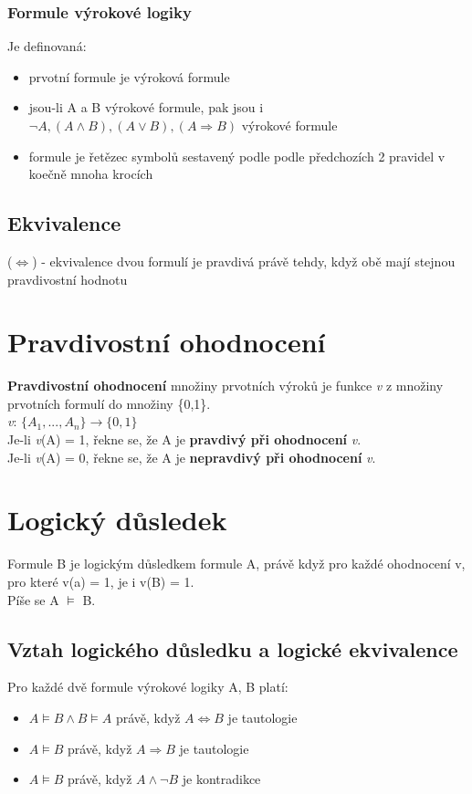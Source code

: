 \documentclass{szzclass}
\begin{document}
\subsubsection{Formule výrokové logiky}
Je definovaná:
\begin{itemize}
	\item prvotní formule je výroková formule
	\item jsou-li A a B výrokové formule, pak jsou i $ \neg A, (A \wedge B), (A \vee B), (A \Rightarrow B)$ výrokové formule
	\item formule je řetězec symbolů sestavený podle podle předchozích 2 pravidel v koečně mnoha krocích
\end{itemize}
\subsection{Ekvivalence}
($\Leftrightarrow$) - ekvivalence dvou formulí je pravdivá právě tehdy, když obě mají stejnou pravdivostní hodnotu
\section{Pravdivostní ohodnocení}
\textbf{Pravdivostní ohodnocení} množiny prvotních výroků je funkce \textit{v} z množiny prvotních formulí do množiny \{0,1\}.
\\
\textit{v}: $\{A_1,...,A_n\}\rightarrow \{0,1\}$
\\
Je-li \textit{v}(A) = 1, řekne se, že A je \textbf{pravdivý při ohodnocení} \textit{v}.\\
Je-li \textit{v}(A) = 0, řekne se, že A je \textbf{nepravdivý při ohodnocení} \textit{v}.
\section{Logický důsledek}
Formule B je logickým důsledkem formule A, právě když pro každé ohodnocení v, pro které v(a) = 1,
je i v(B) = 1.
\\
Píše se A $\models$ B.
\subsection{Vztah logického důsledku a logické ekvivalence}
Pro každé dvě formule výrokové logiky A, B platí:
\begin{itemize}
	\item $A \models B \wedge B \models A$ právě, když $A \Leftrightarrow B$ je tautologie
	\item $A \models B$ právě, když $A \Rightarrow B$ je tautologie
	\item $A \models B$ právě, když $A \wedge \neg B$ je kontradikce
\end{itemize}
\end{document}
